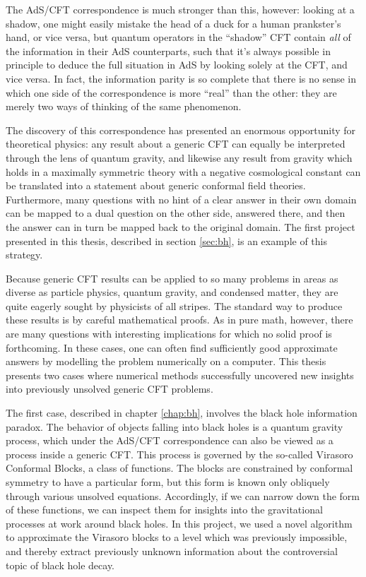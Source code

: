 The AdS/CFT correspondence is much stronger than this, however: looking at a 
shadow, one might easily mistake the head of a duck for a human prankster's 
hand, or vice versa, but quantum operators in the ``shadow'' CFT contain 
\emph{all} of the information in their AdS counterparts, such that it's always 
possible in principle to deduce the full situation in AdS by looking solely at 
the CFT, and vice versa. In fact, the information parity is so complete that 
there is no sense in which one side of the correspondence is more ``real'' than 
the other: they are merely two ways of thinking of the same phenomenon.

The discovery of this correspondence has presented an enormous opportunity for
theoretical physics: any result about a generic CFT can equally be interpreted
through the lens of quantum gravity, and likewise any result from gravity which
holds in a maximally symmetric theory with a negative cosmological constant can 
be translated into a statement about generic conformal field theories. 
Furthermore, many questions with no hint of a clear answer in their own domain 
can be mapped to a dual question on the other side, answered there, and then the 
answer can in turn be mapped back to the original domain. The first project 
presented in this thesis, described in section \ref{sec:bh}, is an example of 
this strategy.

Because generic CFT results can be applied to so many problems in areas as 
diverse as particle physics, quantum gravity, and condensed matter, they are 
quite eagerly sought by physicists of all stripes. The standard way to produce
these results is by careful mathematical proofs. As in pure math, however,
there are many questions with interesting implications for which no solid proof
is forthcoming. In these cases, one can often find sufficiently good approximate
answers by modelling the problem numerically on a computer. This thesis presents
two cases where numerical methods successfully uncovered new insights into 
previously unsolved generic CFT problems.

The first case, described in chapter \ref{chap:bh}, involves the black hole 
information paradox. The behavior of objects falling into black holes is a
quantum gravity process, which under the AdS/CFT correspondence can also be
viewed as a process inside a generic CFT. This process is governed by the
so-called Virasoro Conformal Blocks, a class of functions. The blocks are 
constrained by conformal symmetry to have a particular form, but this form is
known only obliquely through various unsolved equations. Accordingly, if we can
narrow down the form of these functions, we can inspect them for insights into
the gravitational processes at work around black holes. In this project, we used 
a novel algorithm to approximate the Virasoro blocks to a level which was
previously impossible, and thereby extract previously unknown information about
the controversial topic of black hole decay.

